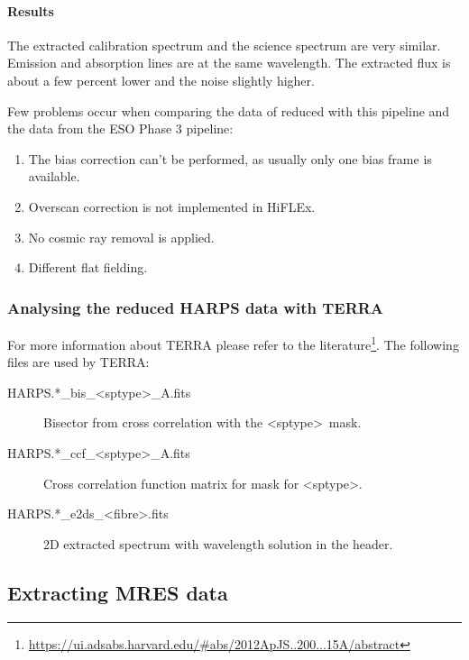\documentclass[10pt,a4paper]{article}
\begin{document}
\paragraph{Results}
The extracted calibration spectrum and the science spectrum are very similar. Emission and absorption lines are at the same wavelength. The extracted flux is about a few percent lower and the noise slightly higher.

Few problems occur when comparing the data of reduced with this pipeline and the data from the ESO Phase 3 pipeline:
\begin{enumerate}\setlength\itemsep{0em}
  \item The bias correction can't be performed, as usually only one bias frame is available.
  \item Overscan correction is not implemented in HiFLEx.
  \item No cosmic ray removal is applied.
  \item Different flat fielding.
\end{enumerate}

\subsubsection{Analysing the reduced HARPS data with TERRA}
For more information about TERRA please refer to the literature\footnote{\url{https://ui.adsabs.harvard.edu/\#abs/2012ApJS..200...15A/abstract}}. The following files are used by TERRA:
\begin{description}
  \item[HARPS.*\_bis\_\textless sptype\textgreater\_A.fits] Bisector from cross correlation with the \textless sptype\textgreater\ mask.
  \item[HARPS.*\_ccf\_\textless sptype\textgreater\_A.fits] Cross correlation function matrix for mask for \textless sptype\textgreater.
  \item[HARPS.*\_e2ds\_\textless fibre\textgreater.fits] 2D extracted spectrum with wavelength solution in the header.
\end{description}

\subsection{Extracting MRES data}
\end{document}
